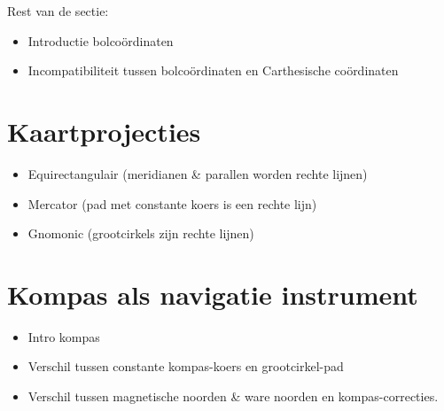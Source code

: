 Rest van de sectie:

\begin{itemize}
	\item Introductie bolco\"ordinaten
	\item Incompatibiliteit tussen bolco\"ordinaten en Carthesische co\"ordinaten
\end{itemize}

\section{Kaartprojecties}

\begin{itemize}
	\item Equirectangulair (meridianen \& parallen worden rechte lijnen)
	\item Mercator (pad met constante koers is een rechte lijn)
	\item Gnomonic (grootcirkels zijn rechte lijnen)
\end{itemize}

\section{Kompas als navigatie instrument}

\begin{itemize}
	\item Intro kompas
	\item Verschil tussen constante kompas-koers en grootcirkel-pad
	\item Verschil tussen magnetische noorden \& ware noorden en kompas-correcties.
\end{itemize}

